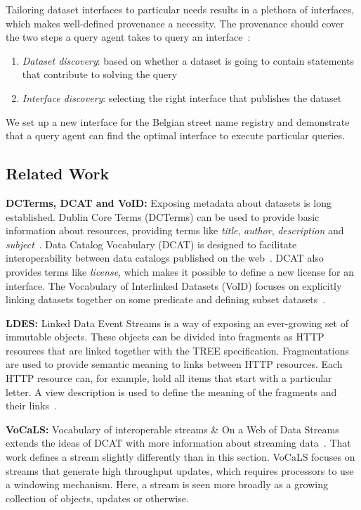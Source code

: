 Tailoring dataset interfaces to particular needs results in a plethora of
interfaces, which makes well-defined provenance a necessity. The provenance
should cover the two steps a query agent takes to query an
interface~\cite{QueryDiscovery1,QueryDiscovery2}:

\begin{enumerate}
  \item \emph{Dataset discovery}: based on whether a dataset is going to
    contain statements that contribute to solving the query
  \item \emph{Interface discovery}: selecting the right interface that
    publishes the dataset
\end{enumerate}

We set up a new interface for the Belgian street name registry and
demonstrate that a query agent can find the optimal interface to execute
particular queries.

\subsection{Related Work}

\textbf{DCTerms, DCAT and VoID:} Exposing metadata about datasets is long
established. Dublin Core Terms (DCTerms) can be used to provide basic
information about resources, providing terms like \emph{title},
\emph{author}, \emph{description} and \emph{subject}~\cite{DCTerms}. Data
Catalog Vocabulary (DCAT) is designed to facilitate interoperability between
data catalogs published on the web~\cite{DCAT}. DCAT also provides terms
like \emph{license}, which makes it possible to define a new license for an
interface. The Vocabulary of Interlinked Datasets (VoID) focuses on
explicitly linking datasets together on some predicate and defining subset
datasets~\cite{VOID}.

\textbf{LDES:} Linked Data Event Streams is a way of exposing an
ever-growing set of immutable objects. These objects can be divided into
fragments as HTTP resources that are linked together with the TREE
specification. Fragmentations are used to provide semantic meaning to links
between HTTP resources. Each HTTP resource can, for example, hold all items
that start with a particular letter. A view description is used to define
the meaning of the fragments and their links~\cite{LDES}.

\textbf{VoCaLS:} Vocabulary of interoperable streams \& On a Web of Data
Streams extends the ideas of DCAT with more information about streaming
data~\cite{VoCaLS}. That work defines a stream slightly differently than in
this section. VoCaLS focuses on streams that generate high throughput
updates, which requires processors to use a windowing mechanism. Here, a
stream is seen more broadly as a growing collection of objects, updates or
otherwise.

